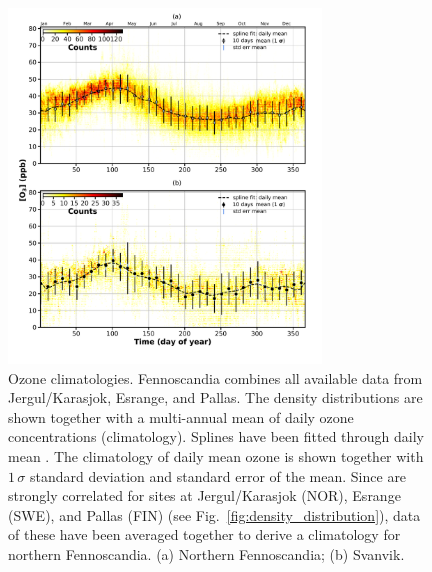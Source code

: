 \documentclass[bg, manuscript]{copernicus}
\begin{document}
\begin{figure}[t]
  \includegraphics[width=8.3cm]{fig06}
  \caption{Ozone climatologies. Fennoscandia combines all available data from Jergul/Karasjok, Esrange, and Pallas. The density distributions are shown together with a multi-annual mean of daily ozone concentrations \chem{[O_3]} (climatology). Splines have been fitted through daily mean \chem{[O_3]}. The climatology of daily mean ozone is shown together with $1\,\sigma$ standard deviation and standard error of the mean. Since \chem{[O_3]} are strongly correlated for sites at Jergul/Karasjok (NOR), Esrange (SWE), and Pallas (FIN) (see Fig.~\ref{fig:density_distribution}), data of these have been averaged together to derive a climatology for northern Fennoscandia. (a) Northern Fennoscandia; (b) Svanvik.}
  \label{fig:ozone_climatology_fenoscandic_obs_spline}
\end{figure}
\end{document}
